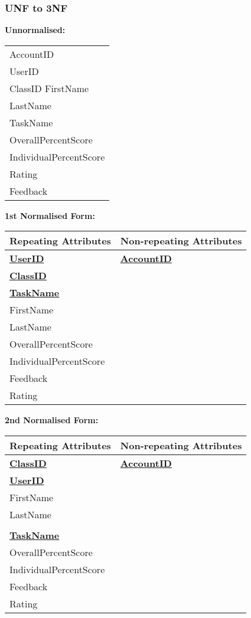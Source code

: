 \subsubsection{UNF to 3NF}

\textbf{Unnormalised: }

\begin{center}
\begin{tabular}{|p{4cm}|} \hline
AccountID \\
UserID \\
ClassID
FirstName \\
LastName \\
TaskName \\
OverallPercentScore \\
IndividualPercentScore \\
Rating \\
Feedback \\ \hline
\end{tabular}
\end{center}

\textbf{1st Normalised Form: }

\begin{center}
\begin{tabular}{|p{4cm}|p{3cm}|} \hline
\textbf{Repeating Attributes} & \textbf{Non-repeating Attributes} \\ \hline
\textbf{\underline{UserID}} & \textbf{\underline{AccountID}} \\
\textbf{\underline{ClassID}} & \\
\textbf{\underline{TaskName}} & \\
FirstName & \\
LastName & \\
OverallPercentScore & \\
IndividualPercentScore & \\
Feedback & \\
Rating & \\ \hline
\end{tabular}
\end{center}

\textbf{2nd Normalised Form: }

\begin{center}
\begin{tabular}{|p{4cm}|p{3cm}|} \hline
\textbf{Repeating Attributes} & \textbf{Non-repeating Attributes} \\ \hline
\textbf{\underline{ClassID}} & \textbf{\underline{AccountID}} \\
\textbf{\underline{UserID}} & \\
FirstName & \\
LastName & \\
 & \\
\textbf{\underline{TaskName}} & \\
OverallPercentScore & \\
IndividualPercentScore & \\
Feedback & \\
Rating & \\ \hline
\end{tabular}
\end{center}

